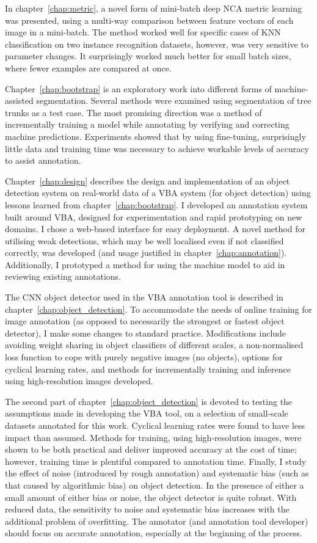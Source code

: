 In chapter~\ref{chap:metric}, a novel form of mini-batch deep \gls{NCA} metric learning was presented, using a multi-way comparison between feature vectors of each image in a mini-batch. The method worked well for specific cases of \gls{KNN} classification on two instance recognition datasets, however, was very sensitive to parameter changes. It surprisingly worked much better for small batch sizes, where fewer examples are compared at once. 

Chapter~\ref{chap:bootstrap} is an exploratory work into different forms of machine-assisted segmentation. Several methods were examined using segmentation of tree trunks as a test case. The most promising direction was a method of incrementally training a model while annotating by verifying and correcting machine predictions. Experiments showed that by using fine-tuning, surprisingly little data and training time was necessary to achieve workable levels of accuracy to assist annotation. 

Chapter~\ref{chap:design} describes the design and implementation of an object detection system on real-world data of a \gls{VBA} system (for object detection) using lessons learned from chapter~\ref{chap:bootstrap}. I developed an annotation system built around \gls{VBA},  designed for experimentation and rapid prototyping on new domains.  I chose a web-based interface for easy deployment. A novel method for utilising weak detections, which may be well localised even if not classified correctly, was developed (and usage justified in chapter~\ref{chap:annotation}). Additionally, I prototyped a method for using the machine model to aid in reviewing existing annotations.

The \gls{CNN} object detector used in the \gls{VBA} annotation tool is described in chapter~\ref{chap:object_detection}. To accommodate the needs of online training for image annotation (as opposed to necessarily the strongest or fastest object detector), I make some changes to standard practice. Modifications include avoiding weight sharing in object classifiers of different scales, a non-normalised loss function to cope with purely negative images (no objects),  options for cyclical learning rates, and methods for incrementally training and inference using high-resolution images developed. 

The second part of chapter~\ref{chap:object_detection} is devoted to testing the assumptions made in developing the \gls{VBA} tool, on a selection of small-scale datasets annotated for this work. Cyclical learning rates were found to have less impact than assumed. Methods for training, using high-resolution images, were shown to be both practical and deliver improved accuracy at the cost of time; however, training time is plentiful compared to annotation time. Finally, I study the effect of noise (introduced by rough annotation) and systematic bias (such as that caused by algorithmic bias) on object detection. In the presence of either a small amount of either bias or noise, the object detector is quite robust. With reduced data, the sensitivity to noise and systematic bias increases with the additional problem of overfitting. The annotator (and annotation tool developer) should focus on accurate annotation, especially at the beginning of the process. 

